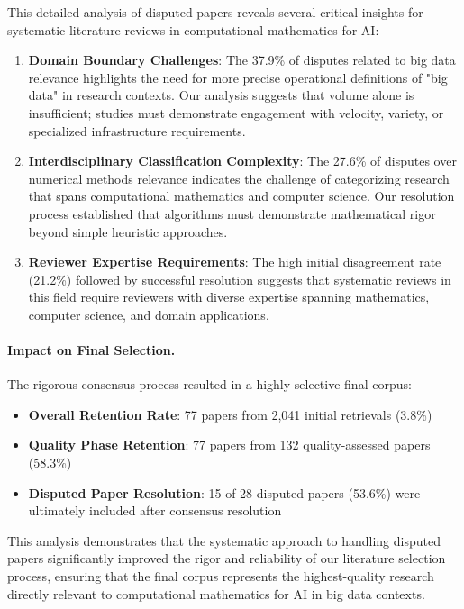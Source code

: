 \documentclass[acmsmall]{acmart}
\begin{document}
This detailed analysis of disputed papers reveals several critical insights for systematic literature reviews in computational mathematics for AI:

\begin{enumerate}
    \item \textbf{Domain Boundary Challenges}: The 37.9\% of disputes related to big data relevance highlights the need for more precise operational definitions of "big data" in research contexts. Our analysis suggests that volume alone is insufficient; studies must demonstrate engagement with velocity, variety, or specialized infrastructure requirements.
    
    \item \textbf{Interdisciplinary Classification Complexity}: The 27.6\% of disputes over numerical methods relevance indicates the challenge of categorizing research that spans computational mathematics and computer science. Our resolution process established that algorithms must demonstrate mathematical rigor beyond simple heuristic approaches.
    
    \item \textbf{Reviewer Expertise Requirements}: The high initial disagreement rate (21.2\%) followed by successful resolution suggests that systematic reviews in this field require reviewers with diverse expertise spanning mathematics, computer science, and domain applications.
\end{enumerate}

\paragraph{Impact on Final Selection.}

The rigorous consensus process resulted in a highly selective final corpus:

\begin{itemize}
    \item \textbf{Overall Retention Rate}: 77 papers from 2,041 initial retrievals (3.8\%)
    \item \textbf{Quality Phase Retention}: 77 papers from 132 quality-assessed papers (58.3\%)
    \item \textbf{Disputed Paper Resolution}: 15 of 28 disputed papers (53.6\%) were ultimately included after consensus resolution
\end{itemize}

This analysis demonstrates that the systematic approach to handling disputed papers significantly improved the rigor and reliability of our literature selection process, ensuring that the final corpus represents the highest-quality research directly relevant to computational mathematics for AI in big data contexts.
\end{document}
